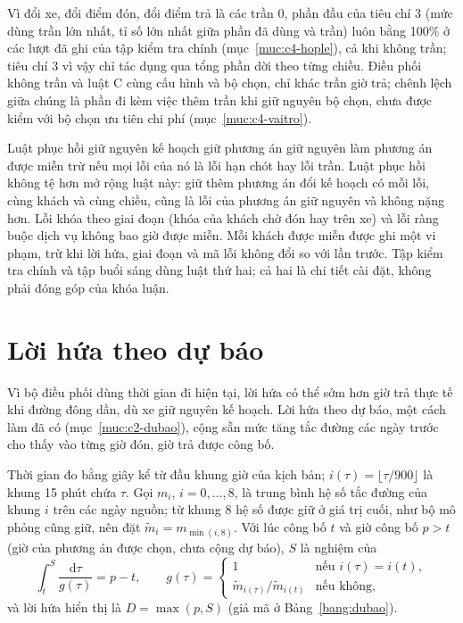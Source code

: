 Vì đổi xe, đổi điểm đón, đổi điểm trả là các trần 0, phần đầu của tiêu chí 3 (mức dùng trần lớn nhất, tỉ số lớn
nhất giữa phần đã dùng và trần) luôn bằng 100\% ở các lượt đã ghi của tập kiểm tra chính (mục~\ref{muc:c4-hople}),
cả khi không trần; tiêu chí 3 vì vậy chỉ tác dụng qua tổng phần dời theo từng chiều. Điều phối không trần và luật C
cùng cấu hình và bộ chọn, chỉ khác trần giờ trả; chênh lệch giữa chúng là phần đi kèm việc thêm trần khi giữ nguyên
bộ chọn, chưa được kiểm với bộ chọn ưu tiên chi phí (mục~\ref{muc:c4-vaitro}).

Luật phục hồi giữ nguyên kế hoạch giữ phương án giữ nguyên làm phương án được miễn trừ nếu mọi lỗi của nó là lỗi
hạn chót hay lỗi trần. Luật phục hồi không tệ hơn mở rộng luật này: giữ thêm phương án đổi kế hoạch có mỗi lỗi,
cùng khách và cùng chiều, cũng là lỗi của phương án giữ nguyên và không nặng hơn. Lỗi khóa theo giai đoạn (khóa của
khách chờ đón hay trên xe) và lỗi ràng buộc dịch vụ không bao giờ được miễn. Mỗi khách được miễn được ghi một vi
phạm, trừ khi lời hứa, giai đoạn và mã lỗi không đổi so với lần trước. Tập kiểm tra chính và tập buổi sáng dùng
luật thứ hai; cả hai là chi tiết cài đặt, không phải đóng góp của khóa luận.

\section{Lời hứa theo dự báo}
\label{muc:dubao}

Vì bộ điều phối dùng thời gian đi hiện tại, lời hứa có thể sớm hơn giờ trả thực tế khi đường đông dần, dù xe giữ
nguyên kế hoạch. Lời hứa theo dự báo, một cách làm đã có (mục~\ref{muc:c2-dubao}), cộng sẵn mức tăng tắc đường các
ngày trước cho thấy vào từng giờ đón, giờ trả được công bố.

Thời gian đo bằng giây kể từ đầu khung giờ của kịch bản; $i(\tau) = \lfloor \tau / 900 \rfloor$ là khung 15 phút
chứa $\tau$. Gọi $m_i$, $i = 0, \ldots, 8$, là trung bình hệ số tắc đường của khung $i$ trên các ngày nguồn; từ
khung 8 hệ số được giữ ở giá trị cuối, như bộ mô phỏng cũng giữ, nên đặt $\tilde m_i = m_{\min(i, 8)}$. Với lúc
công bố $t$ và giờ công bố $p > t$ (giờ của phương án được chọn, chưa cộng dự báo), $S$ là nghiệm của
\begin{equation}
\int_{t}^{S} \frac{\mathrm{d}\tau}{g(\tau)} = p - t, \qquad
g(\tau) =
\begin{cases}
1 & \text{nếu } i(\tau) = i(t),\\
\tilde m_{i(\tau)} / \tilde m_{i(t)} & \text{nếu không,}
\end{cases}
\label{eq:keodan}
\end{equation}
và lời hứa hiển thị là $D = \max(p, S)$ (giả mã ở Bảng~\ref{bang:dubao}).

